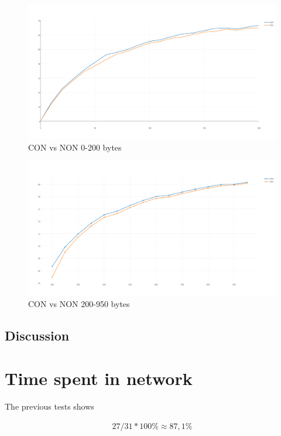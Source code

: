 \begin{figure}[ht]
    \centering
    \includegraphics[scale=0.35]{NONvsCON_0-200.png}    
    \caption{CON vs NON 0-200 bytes}
    \label{fig:CONvsNON0-200}
\end{figure}



\begin{figure}[ht]
    \centering
    \includegraphics[scale=0.35]{NON-CON_200-950GRAPH.png}    
    \caption{CON vs NON 200-950 bytes}
    \label{fig:CONvsNON200-950}
\end{figure}


\subsection{Discussion}



\section{Time spent in network}

The previous tests shows 



\begin{align}
    27/31*100\% \approx 87,1 \%
\end{align}








